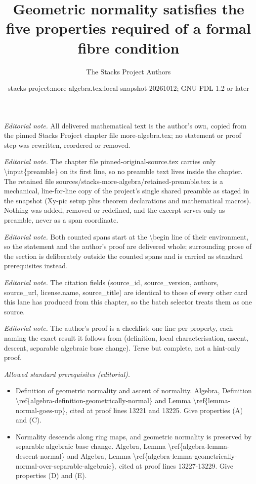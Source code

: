 \documentclass[10pt,a4paper]{amsart}
\title{Geometric normality satisfies the five properties required of a formal fibre condition}
\author{The Stacks Project Authors}
\date{stacks-project:more-algebra.tex:local-snapshot-20261012; GNU FDL 1.2 or later}
\theoremstyle{plain}
\theoremstyle{definition}
\theoremstyle{remark}
\numberwithin{equation}{subsection}
\begin{document}
\maketitle
\setcounter{subsection}{1}
\noindent\textit{Editorial note.} All delivered mathematical text is the author's own, copied from the pinned Stacks Project chapter file more-algebra.tex; no statement or proof step was rewritten, reordered or removed.\par\medskip
\noindent\textit{Editorial note.} The chapter file pinned-original-source.tex carries only \textbackslash{}input\{preamble\} on its first line, so no preamble text lives inside the chapter. The retained file sources/stacks-more-algebra/retained-preamble.tex is a mechanical, line-for-line copy of the project's single shared preamble as staged in the snapshot (Xy-pic setup plus theorem declarations and mathematical macros). Nothing was added, removed or redefined, and the excerpt serves only as preamble, never as a span coordinate.\par\medskip
\noindent\textit{Editorial note.} Both counted spans start at the \textbackslash{}begin line of their environment, so the statement and the author's proof are delivered whole; surrounding prose of the section is deliberately outside the counted spans and is carried as standard prerequisites instead.\par\medskip
\noindent\textit{Editorial note.} The citation fields (source\_id, source\_version, authors, source\_url, license.name, source\_title) are identical to those of every other card this lane has produced from this chapter, so the batch selector treats them as one source.\par\medskip
\noindent\textit{Editorial note.} The author's proof is a checklist: one line per property, each naming the exact result it follows from (definition, local characterisation, ascent, descent, separable algebraic base change). Terse but complete, not a hint-only proof.\par\medskip
\noindent\textit{Allowed standard prerequisites (editorial).}\begin{itemize}
\item Definition of geometric normality and ascent of normality. Algebra, Definition \textbackslash{}ref\{algebra-definition-geometrically-normal\} and Lemma \textbackslash{}ref\{lemma-normal-goes-up\}, cited at proof lines 13221 and 13225. Give properties (A) and (C).
\item Normality descends along ring maps, and geometric normality is preserved by separable algebraic base change. Algebra, Lemma \textbackslash{}ref\{algebra-lemma-descent-normal\} and Algebra, Lemma \textbackslash{}ref\{algebra-lemma-geometrically-normal-over-separable-algebraic\}, cited at proof lines 13227-13229. Give properties (D) and (E).
\end{itemize}\medskip
\end{document}
